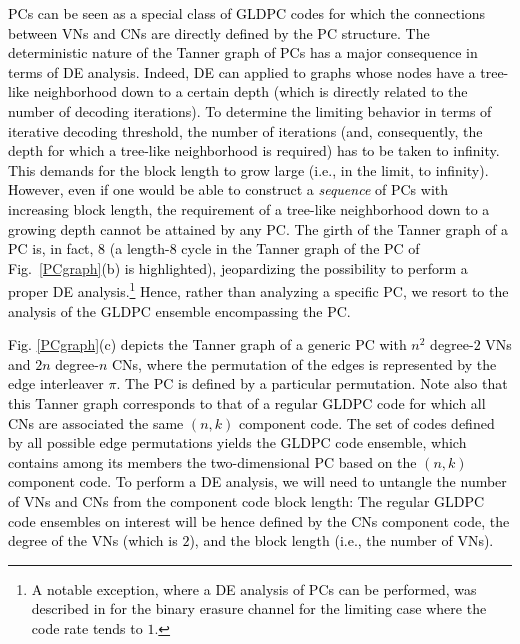 \documentclass[journal]{IEEEtran}
\newcommand{\SH}{\textcolor{black}}
\newcommand{\SHm}{\textcolor{black}}
\newcommand{\GL}{\textcolor{black}}
\newcommand{\AG}{\textcolor{black}}
\newcommand{\AGc}{\textcolor{black}}
\newcommand{\GLC}[1]{\textcolor{black}{\textbf{\textit{#1}}}}
\begin{document}
\GL{PCs can be seen as a special class of GLDPC codes \AG{for which the connections between VNs and CNs are directly defined by the PC structure}. The deterministic nature of the  Tanner graph of PCs has a major consequence in terms of DE analysis. Indeed, DE can applied to graphs whose nodes have a tree-like neighborhood down to a certain depth (which is directly related to the number of \AG{decoding iterations}). To determine the limiting behavior in terms of iterative decoding threshold, the number of iterations (and, consequently, the depth for which a tree-like neighborhood is required) has to be taken to infinity. This demands for the block length to grow large (i.e., in the limit, to infinity). However, even if one would be able to construct a \emph{sequence} of PCs with increasing block length, the requirement of a tree-like neighborhood down to a growing depth cannot be attained by any PC. The girth of the Tanner graph of a PC is, in fact, $8$ (\SH{a length-$8$} cycle in the Tanner graph of the PC of Fig.~\ref{PCgraph}(b) is highlighted), jeopardizing the possibility to perform a proper DE analysis.\footnote{\GL{A notable exception, where a DE analysis of PCs can be performed, was described in \cite{Haeger2017tit} for the binary erasure channel for the limiting case where the code rate tends to $1$}.} Hence, rather than analyzing a specific PC, we resort to the analysis of the GLDPC ensemble encompassing the PC.} 
	
\GL{\AGc{
\SHm{Fig. \ref{PCgraph}(c) depicts the Tanner graph of a generic PC with $n^2$ degree-$2$ VNs and $2n$ degree-$n$ CNs, where the permutation of the edges is represented by the edge interleaver $\pi$. The PC is defined by a particular permutation. Note also that this Tanner graph corresponds to that of a regular GLDPC code for which all CNs are associated the same $(n,k)$ component code.
The set of codes defined by all possible edge permutations yields the GLDPC code ensemble, which contains among its members the two-dimensional \SH{PC} based on the $(n,k)$ component code.}}
To perform a  DE analysis, we  will need to untangle the number of VNs and CNs from the component code block length: The regular GLDPC code ensembles on interest will be hence defined by the CNs component code, the degree of the VNs (which is $2$), and the block length (i.e., the number of VNs).} 
\end{document}
